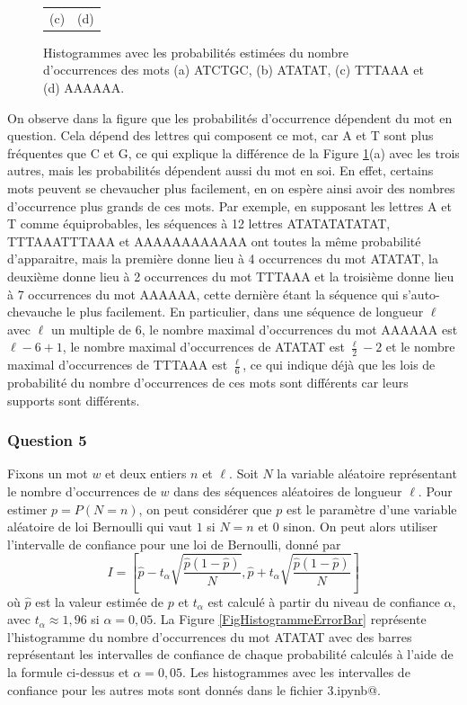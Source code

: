\documentclass[a4paper,12pt]{article}
\begin{document}
\begin{figure}
\begin{tabular}{@{} c @{} c @{}}
(c) & (d) \tabularnewline
\end{tabular}
\caption{Histogrammes avec les probabilités estimées du nombre d'occurrences des mots (a) ATCTGC, (b) ATATAT, (c) TTTAAA et (d) AAAAAA.}
\label{FigHistogrammes}
\end{figure}

On observe dans la figure que les probabilités d'occurrence dépendent du mot en question. Cela dépend des lettres qui composent ce mot, car A et T sont plus fréquentes que C et G, ce qui explique la différence de la Figure \ref{FigHistogrammes}(a) avec les trois autres, mais les probabilités dépendent aussi du mot en soi. En effet, certains mots peuvent se chevaucher plus facilement, en on espère ainsi avoir des nombres d'occurrence plus grands de ces mots. Par exemple, en supposant les lettres A et T comme équiprobables, les séquences à 12 lettres ATATATATATAT, TTTAAATTTAAA et AAAAAAAAAAAA ont toutes la même probabilité d'apparaitre, mais la première donne lieu à 4 occurrences du mot ATATAT, la deuxième donne lieu à 2 occurrences du mot TTTAAA et la troisième donne lieu à 7 occurrences du mot AAAAAA, cette dernière étant la séquence qui s'auto-chevauche le plus facilement. En particulier, dans une séquence de longueur $\ell$ avec $\ell$ un multiple de 6, le nombre maximal d'occurrences du mot AAAAAA est $\ell - 6 + 1$, le nombre maximal d'occurrences de ATATAT est $\frac{\ell}{2} - 2$ et le nombre maximal d'occurrences de TTTAAA est $\frac{\ell}{6}$, ce qui indique déjà que les lois de probabilité du nombre d'occurrences de ces mots sont différents car leurs supports sont différents.

\subsubsection*{Question 5}

Fixons un mot $w$ et deux entiers $n$ et $\ell$. Soit $N$ la variable aléatoire représentant le nombre d'occurrences de $w$ dans des séquences aléatoires de longueur $\ell$. Pour estimer $p = P(N = n)$, on peut considérer que $p$ est le paramètre d'une variable aléatoire de loi Bernoulli qui vaut $1$ si $N = n$ et $0$ sinon. On peut alors utiliser l'intervalle de confiance pour une loi de Bernoulli, donné par
\[
I = \left[\hat p - t_\alpha \sqrt{\frac{\hat p (1 - \hat p)}{N}}, \hat p + t_\alpha \sqrt{\frac{\hat p (1 - \hat p)}{N}}\right]
\]
où $\hat p$ est la valeur estimée de $p$ et $t_\alpha$ est calculé à partir du niveau de confiance $\alpha$, avec $t_\alpha \approx 1,96$ si $\alpha = 0,05$. La Figure \ref{FigHistogrammeErrorBar} représente l'histogramme du nombre d'occurrences du mot ATATAT avec des barres représentant les intervalles de confiance de chaque probabilité calculés à l'aide de la formule ci-dessus et $\alpha = 0,05$. Les histogrammes avec les intervalles de confiance pour les autres mots sont donnés dans le fichier \verb@Projet3.ipynb@.
\end{document}

